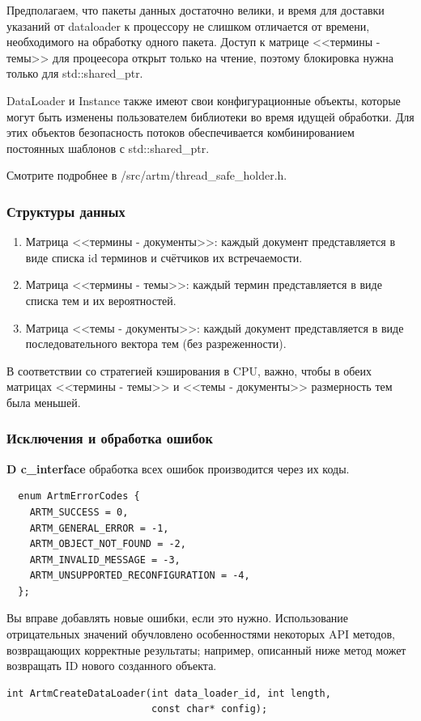 \documentclass[12pt]{article}
\begin{document}
Предполагаем, что пакеты данных достаточно велики, и время для доставки указаний от dataloader к процессору не слишком отличается от времени, необходимого на обработку одного пакета. Доступ к матрице <<термины - темы>> для процеесора открыт только на чтение, поэтому блокировка нужна только для std::shared\_ptr.

DataLoader и Instance также имеют свои конфигурационные объекты, которые могут быть изменены пользователем библиотеки во время идущей обработки.
Для этих объектов безопасность потоков обеспечивается комбинированием постоянных шаблонов с std::shared\_ptr.

Смотрите подробнее в /src/artm/thread\_safe\_holder.h.

\subsubsection{Структуры данных}
\begin{enumerate}
    \item Матрица <<термины - документы>>: каждый документ представляется в виде списка id терминов и счётчиков их встречаемости.
    \item Матрица <<термины - темы>>: каждый термин представляется в виде списка тем и их вероятностей.
    \item Матрица <<темы - документы>>: каждый документ представляется в виде последовательного вектора тем (без разреженности).
\end{enumerate}

В соответствии со стратегией кэширования в CPU, важно, чтобы в обеих матрицах <<термины - темы>> и <<темы - документы>> размерность тем была меньшей.

\subsubsection{Исключения и обработка ошибок}

\textbf{D c\_interface} обработка всех ошибок производится через их коды.
\begin{verbatim}
  enum ArtmErrorCodes {
    ARTM_SUCCESS = 0,
    ARTM_GENERAL_ERROR = -1,
    ARTM_OBJECT_NOT_FOUND = -2,
    ARTM_INVALID_MESSAGE = -3,
    ARTM_UNSUPPORTED_RECONFIGURATION = -4,
  };
\end{verbatim}  
Вы вправе добавлять новые ошибки, если это нужно.
Использование отрицательных значений обучловлено особенностями некоторых API методов, возвращающих корректные результаты; например, описанный ниже метод может возвращать ID нового созданного объекта.
\begin{verbatim}
int ArtmCreateDataLoader(int data_loader_id, int length, 
                         const char* config);
\end{verbatim}
\end{document}
